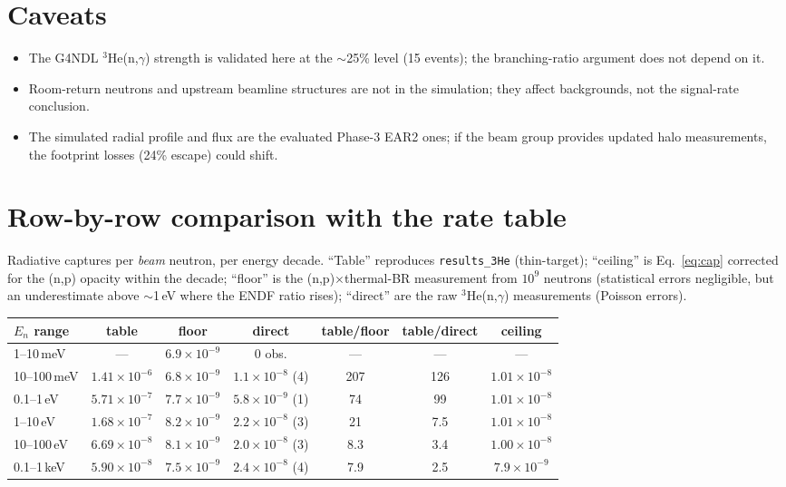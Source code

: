 \documentclass[11pt,a4paper]{article}
\newcommand{\He}[1]{$^{#1}$He}
\begin{document}
\section*{Caveats}
\begin{itemize}
  \item The G4NDL \He{3}(n,$\gamma$) strength is validated here at the
        $\sim$25\% level (15 events); the branching-ratio argument does not
        depend on it.
  \item Room-return neutrons and upstream beamline structures are not in
        the simulation; they affect backgrounds, not the signal-rate
        conclusion.
  \item The simulated radial profile and flux are the evaluated Phase-3
        EAR2 ones; if the beam group provides updated halo measurements,
        the footprint losses (24\% escape) could shift.
\end{itemize}

\clearpage
\appendix
\section{Row-by-row comparison with the rate table}

Radiative captures per \emph{beam} neutron, per energy decade. ``Table''
reproduces \texttt{results\_3He} (thin-target); ``ceiling'' is
Eq.~\eqref{eq:cap} corrected for the (n,p) opacity within the decade;
``floor'' is the (n,p)$\times$thermal-BR measurement from $10^{9}$
neutrons (statistical errors negligible, but an underestimate above
$\sim$1\,eV where the ENDF ratio rises); ``direct'' are the raw
\He{3}(n,$\gamma$) measurements (Poisson errors).

\begin{center}
\begin{tabular}{lcccccc}
\hline
$E_n$ range & table & floor & direct & table/floor & table/direct & ceiling \\
\hline
1--10\,meV   & ---                 & $6.9\times10^{-9}$ & 0 obs.              & ---  & --- & --- \\
10--100\,meV & $1.41\times10^{-6}$ & $6.8\times10^{-9}$ & $1.1\times10^{-8}$ (4) & 207 & 126 & $1.01\times10^{-8}$ \\
0.1--1\,eV   & $5.71\times10^{-7}$ & $7.7\times10^{-9}$ & $5.8\times10^{-9}$ (1) & 74  & 99  & $1.01\times10^{-8}$ \\
1--10\,eV    & $1.68\times10^{-7}$ & $8.2\times10^{-9}$ & $2.2\times10^{-8}$ (3) & 21  & 7.5 & $1.01\times10^{-8}$ \\
10--100\,eV  & $6.69\times10^{-8}$ & $8.1\times10^{-9}$ & $2.0\times10^{-8}$ (3) & 8.3 & 3.4 & $1.00\times10^{-8}$ \\
0.1--1\,keV  & $5.90\times10^{-8}$ & $7.5\times10^{-9}$ & $2.4\times10^{-8}$ (4) & 7.9 & 2.5 & $7.9\times10^{-9}$ \\
\hline
\end{tabular}
\end{center}
\end{document}
